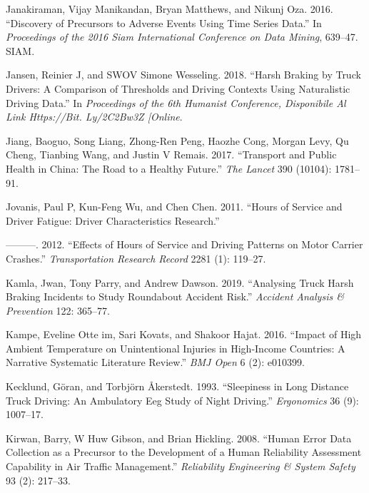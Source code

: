 \documentclass[12pt]{book}
\numberwithin{equation}{chapter}
\begin{document}
\leavevmode\hypertarget{ref-janakiraman2016discovery}{}%
Janakiraman, Vijay Manikandan, Bryan Matthews, and Nikunj Oza. 2016. ``Discovery of Precursors to Adverse Events Using Time Series Data.'' In \emph{Proceedings of the 2016 Siam International Conference on Data Mining}, 639--47. SIAM.

\leavevmode\hypertarget{ref-jansen2018harsh}{}%
Jansen, Reinier J, and SWOV Simone Wesseling. 2018. ``Harsh Braking by Truck Drivers: A Comparison of Thresholds and Driving Contexts Using Naturalistic Driving Data.'' In \emph{Proceedings of the 6th Humanist Conference, Disponibile Al Link Https://Bit. Ly/2C2Bw3Z {[}Online}.

\leavevmode\hypertarget{ref-jiang2017transport}{}%
Jiang, Baoguo, Song Liang, Zhong-Ren Peng, Haozhe Cong, Morgan Levy, Qu Cheng, Tianbing Wang, and Justin V Remais. 2017. ``Transport and Public Health in China: The Road to a Healthy Future.'' \emph{The Lancet} 390 (10104): 1781--91.

\leavevmode\hypertarget{ref-jovanis2011hours}{}%
Jovanis, Paul P, Kun-Feng Wu, and Chen Chen. 2011. ``Hours of Service and Driver Fatigue: Driver Characteristics Research.''

\leavevmode\hypertarget{ref-jovanis2012effects}{}%
---------. 2012. ``Effects of Hours of Service and Driving Patterns on Motor Carrier Crashes.'' \emph{Transportation Research Record} 2281 (1): 119--27.

\leavevmode\hypertarget{ref-kamla2019analysing}{}%
Kamla, Jwan, Tony Parry, and Andrew Dawson. 2019. ``Analysing Truck Harsh Braking Incidents to Study Roundabout Accident Risk.'' \emph{Accident Analysis \& Prevention} 122: 365--77.

\leavevmode\hypertarget{ref-im2016impact}{}%
Kampe, Eveline Otte im, Sari Kovats, and Shakoor Hajat. 2016. ``Impact of High Ambient Temperature on Unintentional Injuries in High-Income Countries: A Narrative Systematic Literature Review.'' \emph{BMJ Open} 6 (2): e010399.

\leavevmode\hypertarget{ref-kecklund1993sleepiness}{}%
Kecklund, Göran, and Torbjörn Åkerstedt. 1993. ``Sleepiness in Long Distance Truck Driving: An Ambulatory Eeg Study of Night Driving.'' \emph{Ergonomics} 36 (9): 1007--17.

\leavevmode\hypertarget{ref-kirwan2008human}{}%
Kirwan, Barry, W Huw Gibson, and Brian Hickling. 2008. ``Human Error Data Collection as a Precursor to the Development of a Human Reliability Assessment Capability in Air Traffic Management.'' \emph{Reliability Engineering \& System Safety} 93 (2): 217--33.
\end{document}

